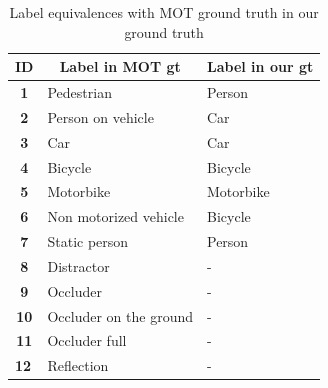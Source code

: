 \begin{table}[H]
\scriptsize
\begin{center}
\begin{tabular}{|c|l|l|}
\hline
\textbf{ID}                       & \multicolumn{1}{c|}{\textbf{Label in MOT gt}} & \multicolumn{1}{c|}{\textbf{Label in our gt}} \\ \hline
\textbf{1}                        & Pedestrian                                    & Person                                        \\ \hline
\textbf{2}                        & Person on vehicle                             & Car                                           \\ \hline
\textbf{3}                        & Car                                           & Car                                           \\ \hline
\textbf{4}                        & Bicycle                                       & Bicycle                                       \\ \hline
\textbf{5}                        & Motorbike                                     & Motorbike                                     \\ \hline
\textbf{6}                        & Non motorized vehicle                         & Bicycle                                       \\ \hline
\textbf{7}                        & Static person                                 & Person                                        \\ \hline
\textbf{8}                        & Distractor                                    & -                                             \\ \hline
\textbf{9}                        & Occluder                                      & -                                             \\ \hline
\textbf{10}                       & Occluder on the ground                        & -                                             \\ \hline
\textbf{11}                       & Occluder full                                 & -                                             \\ \hline
\multicolumn{1}{|l|}{\textbf{12}} & Reflection                                    & -                                             \\ \hline
\end{tabular}
\end{center}
\caption{Label equivalences with MOT ground truth in our ground truth}
\label{tab:mot_labels}
\end{table}
